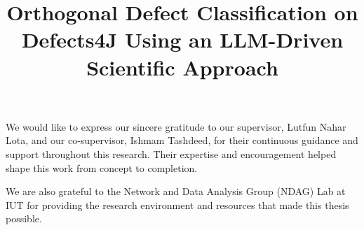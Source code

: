 \documentclass{iutbscthesis}
\title{Orthogonal Defect Classification on Defects4J Using an LLM-Driven Scientific Approach}
\begin{document}

\coverpage
{}
\titlepage
\declarationofcandidate


\tableofcontents
\listoffigures
\listoftables

\clearpage

\begin{abbreviations}
\end{abbreviations}

\begin{acknowledgement}
We would like to express our sincere gratitude to our supervisor, Lutfun Nahar Lota, and our co-supervisor, Ishmam Tashdeed, for their continuous guidance and support throughout this research. Their expertise and encouragement helped shape this work from concept to completion.

We are also grateful to the Network and Data Analysis Group (NDAG) Lab at IUT for providing the research environment and resources that made this thesis possible.


\end{acknowledgement}
\end{document}
